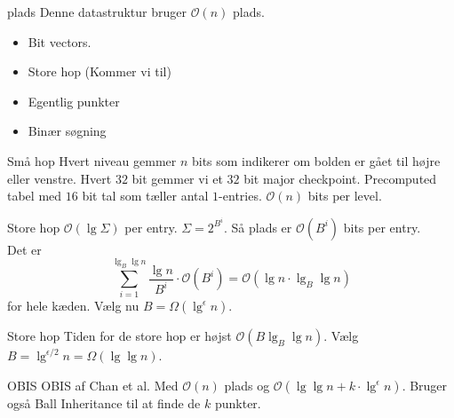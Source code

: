\documentclass[pdf]{beamer}
\begin{document}
\begin{frame}{plads}
  Denne datastruktur bruger $\mathcal{O}(n)$ plads.
  \begin{itemize}
    \item Bit vectors.
      \pause
    \item Store hop (Kommer vi til)
      \pause
    \item Egentlig punkter
      \pause
    \item Binær søgning
  \end{itemize}
\end{frame}

\begin{frame}{Små hop}
  Hvert niveau gemmer $n$ bits som indikerer om bolden er gået til højre eller venstre. Hvert $32$ bit gemmer vi et $32$ bit major checkpoint. Precomputed tabel med $16$ bit tal som tæller antal $1$-entries. $\mathcal{O}(n)$ bits per level.
\end{frame}

\begin{frame}{Store hop}
  $\mathcal{O}(\lg \Sigma)$ per entry. $\Sigma = 2^{B^i}$. Så plads er $\mathcal{O}(B^i)$ bits per entry.\\

  Det er $$\sum_{i=1}^{\lg_B \lg n} \frac{\lg n}{B^i}\cdot\mathcal{O}(B^i) = \mathcal{O}(\lg n \cdot \lg_B \lg n)$$ for hele kæden. Vælg nu $B = \Omega(\lg^\epsilon n)$.
\end{frame}

\begin{frame}{Store hop}
  Tiden for de store hop er højst $\mathcal{O}(B \lg_B \lg n)$. Vælg $B = \lg^{\epsilon / 2} n = \Omega(\lg \lg n)$.
\end{frame}

\begin{frame}{OBIS}
  OBIS af Chan et al. Med $\mathcal{O}(n)$ plads og $\mathcal{O}(\lg \lg n + k\cdot\lg^\epsilon n)$. Bruger også Ball Inheritance til at finde de $k$ punkter.
\end{frame}
\end{document}
